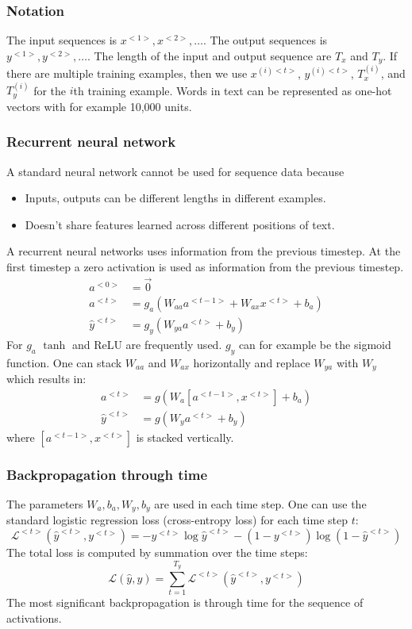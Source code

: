 \documentclass{article}
\begin{document}
\subsubsection{Notation}
The input sequences is $x^{<1>}, x^{<2>}, \ldots$.
The output sequences is $y^{<1>}, y^{<2>}, \ldots$.
The length of the input and output sequence are $T_x$ and $T_y$.
If there are multiple training examples, then we use $x^{(i)<t>}$, $y^{(i)<t>}$, $T_x^{(i)}$, and $T_y^{(i)}$
for the $i$th training example.
Words in text can be represented as one-hot vectors with for example 10,000 units.

\subsubsection{Recurrent neural network}
A standard neural network cannot be used for sequence data because
\begin{itemize}
  \item Inputs, outputs can be different lengths in different examples.
  \item Doesn't share features learned across different positions of text.
\end{itemize}
A recurrent neural networks uses information from the previous timestep.
At the first timestep a zero activation is used as information from the previous timestep.
\begin{equation}
  \begin{split}
    a^{<0>}&=\vec{0}\\
    a^{<t>}&=g_a(W_{aa}a^{<t-1>}+W_{ax}x^{<t>}+b_a)\\
    \hat{y}^{<t>}&=g_y(W_{ya}a^{<t>}+b_y)
  \end{split}
\end{equation}
For $g_a$ $\tanh$ and ReLU are frequently used.
$g_y$ can for example be the sigmoid function.
One can stack $W_{aa}$ and $W_{ax}$ horizontally and replace $W_{ya}$ with $W_y$ which results in:
\begin{equation}
  \begin{split}
    a^{<t>}&=g(W_a[a^{<t-1>},x^{<t>}]+b_a)\\
    \hat{y}^{<t>}&=g(W_ya^{<t>}+b_y)
  \end{split}
\end{equation}
where $[a^{<t-1>},x^{<t>}]$ is stacked vertically.

\subsubsection{Backpropagation through time}
The parameters $W_a, b_a, W_y, b_y$ are used in each time step.
One can use the standard logistic regression loss (cross-entropy loss) for each time step $t$:
\begin{equation}
  \mathcal{L}^{<t>}(\hat{y}^{<t>},y^{<t>})=-y^{<t>}\log\hat{y}^{<t>}-(1-y^{<t>})\log(1-\hat{y}^{<t>})
\end{equation}
The total loss is computed by summation over the time steps:
\begin{equation}
  \mathcal{L}(\hat{y},y)=\sum_{t=1}^{T_y}\mathcal{L}^{<t>}(\hat{y}^{<t>},y^{<t>})
\end{equation}
The most significant backpropagation is through time for the sequence of activations.
\end{document}
